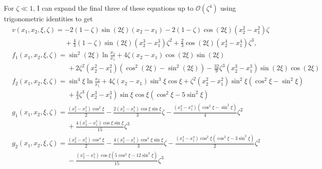 \documentclass[12pt]{article}
\begin{document}
For $\zeta\ll1$, I can expand the final three of these equations up to $\mathcal{O}(\zeta^4)$ using trigonometric identities to get
\begin{subequations}
\begin{align}
&v(x_1,x_2,\xi,\zeta)= -2(1-\zeta)\sin(2\xi)(x_2-x_1)-2(1-\zeta)\cos(2\xi)(x_2^2-x_1^2)\zeta\nonumber\\
&\phantom{v(x_1,x_2,\xi,\zeta)= }+\frac{4}{3}(1-\zeta)\sin(2\xi)(x_2^3-x_1^3)\zeta^2+\frac{2}{3}\cos(2\xi)(x_2^4-x_1^4)\zeta^3,\\
&f_1(x_1,x_2,\xi,\zeta)=\sin^2\left(2\xi\right)\ln\frac{x_2}{x_1}+4\zeta(x_2-x_1)\cos(2\xi)\sin(2\xi)\nonumber\\
&\phantom{f_1(x_1,x_2,\xi,\zeta)=}+2\zeta^2(x_2^2-x_1^2)\left(\cos^2(2\xi)-\sin^2(2\xi)\right)-\frac{32}{9}\zeta^3(x_2^3-x_1^3)\sin(2\xi)\cos(2\xi)\\
&f_2(x_1,x_2,\xi,\zeta)=\sin^4\xi\ln\frac{x_2}{x_1}+4\zeta(x_2-x_1)\sin^3\xi\cos\xi+\zeta^2(x_2^2-x_1^2)\sin^2\xi(\cos^2\xi-\sin^2\xi)\nonumber\\
&\phantom{f_2(x_1,x_2,\xi,\zeta)=}+\frac{4}{3}\zeta^3(x_2^3-x_1^3)\sin\xi\cos\xi\left(\cos^2\xi-5\sin^2\xi\right)\\
&g_1(x_1,x_2,\xi,\zeta)=\frac{(x_2^2-x_1^2)\cos^2\xi}{2}-\frac{2(x_2^3-x_1^3)\cos\xi\sin\xi}{3}\zeta-\frac{(x_2^4-x_1^4)(\cos^2\xi-\sin^2\xi)}{4}\zeta^2\nonumber\\
&\phantom{g_1(x_1,x_2,\xi,\zeta)=}+\frac{4(x_2^5-x_1^5)\cos\xi\sin\xi}{15}\zeta^3\nonumber\\
&g_2(x_1,x_2,\xi,\zeta)=\frac{(x_2^2-x_1^2)\cos^4\xi}{2}-\frac{4(x_2^3-x_1^3)\cos^3\xi\sin\xi}{3}\zeta-\frac{(x_2^4-x_1^4)\cos^2\xi(\cos^2\xi-3\sin^2\xi)}{2}\zeta^2\nonumber\\
&\phantom{g_2(x_1,x_2,\xi,\zeta)=}-\frac{(x_2^5-x_1^5)\cos\xi(5\cos^3\xi-12\sin^3\xi)}{15}\zeta^3
\end{align}
\end{subequations}
\end{document}
